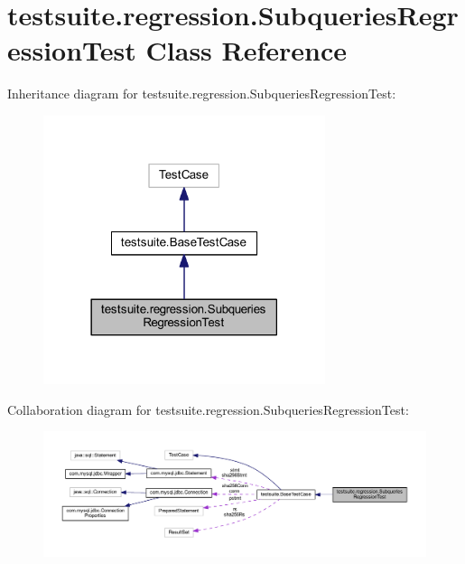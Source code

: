 \hypertarget{classtestsuite_1_1regression_1_1_subqueries_regression_test}{}\section{testsuite.\+regression.\+Subqueries\+Regression\+Test Class Reference}
\label{classtestsuite_1_1regression_1_1_subqueries_regression_test}


Inheritance diagram for testsuite.\+regression.\+Subqueries\+Regression\+Test\+:
\nopagebreak
\begin{figure}[H]
\begin{center}
\leavevmode
\includegraphics[width=234pt]{classtestsuite_1_1regression_1_1_subqueries_regression_test__inherit__graph}
\end{center}
\end{figure}


Collaboration diagram for testsuite.\+regression.\+Subqueries\+Regression\+Test\+:
\nopagebreak
\begin{figure}[H]
\begin{center}
\leavevmode
\includegraphics[width=350pt]{classtestsuite_1_1regression_1_1_subqueries_regression_test__coll__graph}
\end{center}
\end{figure}
